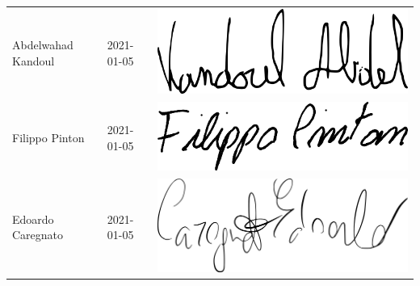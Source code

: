 {\begin{longtable}{ C{5cm} C{3.4cm} C{5cm} }
		{Abdelwahad Kandoul} & 2021-01-05 & \includegraphics[scale=0.20]{./src/Organigramma/immagini/firme/abdel.png}\\
		{Filippo Pinton} & 2021-01-05 & \includegraphics[scale=0.20]{./src/Organigramma/immagini/firme/filippo.png}\\
		{Edoardo Caregnato} & 2021-01-05 & \includegraphics[scale=0.20]{./src/Organigramma/immagini/firme/edoardo.png}
	\end{longtable}
}


